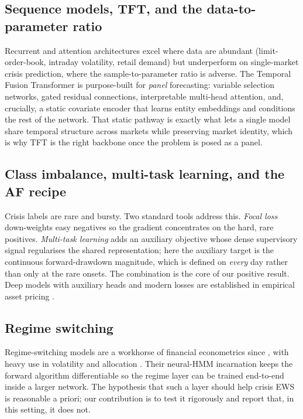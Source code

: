 \documentclass[11pt,a4paper]{article}
\begin{document}
\subsection{Sequence models, TFT, and the data-to-parameter ratio}
Recurrent and attention architectures excel where data are abundant
(limit-order-book, intraday volatility, retail demand) but underperform on
single-market crisis prediction, where the sample-to-parameter ratio is
adverse. The Temporal Fusion Transformer \citep{lim2021tft} is purpose-built
for \emph{panel} forecasting: variable selection networks, gated residual
connections, interpretable multi-head attention, and, crucially, a static
covariate encoder that learns entity embeddings and conditions the rest of
the network. That static pathway is exactly what lets a single model share
temporal structure across markets while preserving market identity, which is
why TFT is the right backbone once the problem is posed as a panel.

\subsection{Class imbalance, multi-task learning, and the AF recipe}
Crisis labels are rare and bursty. Two standard tools address this. \emph{Focal
loss} \citep{lin2017focal} down-weights easy negatives so the gradient
concentrates on the hard, rare positives. \emph{Multi-task learning} adds an
auxiliary objective whose dense supervisory signal regularises the shared
representation; here the auxiliary target is the continuous forward-drawdown
magnitude, which is defined on \emph{every} day rather than only at the rare
onsets. The combination is the core of our positive result. Deep models with
auxiliary heads and modern losses are established in empirical asset pricing
\citep{gukellyxiu2020}.

\subsection{Regime switching}
Regime-switching models are a workhorse of financial econometrics since
\citet{hamilton1989new}, with heavy use in volatility and allocation
\citep{angbekaert2002regime}. Their neural-HMM incarnation
\citep{tran2016unsupervised} keeps the forward algorithm differentiable so
the regime layer can be trained end-to-end inside a larger network. The
hypothesis that such a layer should help crisis EWS is reasonable a priori;
our contribution is to test it rigorously and report that, in this setting,
it does not.
\end{document}
